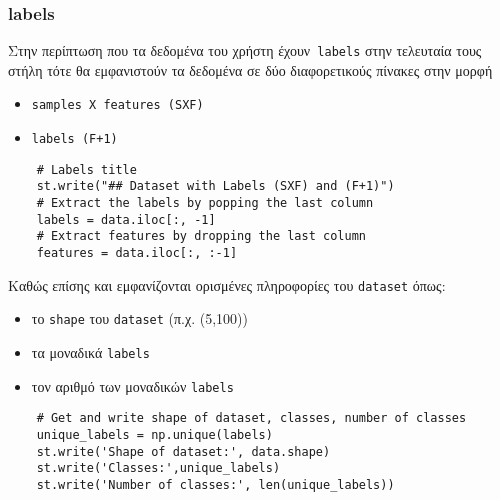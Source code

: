 \documentclass[a4paper,12pt]{article}
\begin{document}
\subsubsection{labels}
Στην περίπτωση που τα δεδομένα του χρήστη έχουν\texttt{ labels} στην τελευταία τους στήλη τότε θα εμφανιστούν τα δεδομένα σε δύο διαφορετικούς πίνακες στην μορφή
\begin{itemize}
  \item \texttt{samples X features (SXF)}
  \item \texttt{labels (F+1)}
\end{itemize}
\begin{lstlisting}
    # Labels title
    st.write("## Dataset with Labels (SXF) and (F+1)")
    # Extract the labels by popping the last column
    labels = data.iloc[:, -1]
    # Extract features by dropping the last column
    features = data.iloc[:, :-1]
\end{lstlisting}



\newpage




Καθώς επίσης και εμφανίζονται ορισμένες πληροφορίες του \texttt{dataset} όπως:
\begin{itemize}
  \item το \texttt{shape} του \texttt{dataset} (π.χ. (5,100))
  \item τα μοναδικά \texttt{labels}
  \item τον αριθμό των μοναδικών \texttt{labels}
\end{itemize}
\begin{lstlisting}
    # Get and write shape of dataset, classes, number of classes
    unique_labels = np.unique(labels)
    st.write('Shape of dataset:', data.shape)
    st.write('Classes:',unique_labels)
    st.write('Number of classes:', len(unique_labels))
\end{lstlisting}
\end{document}
